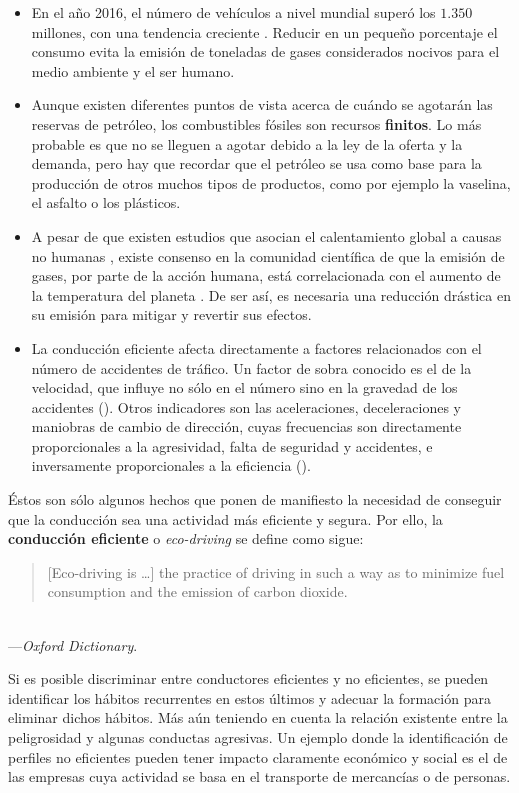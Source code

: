 \begin{itemize}
	\item En el año 2016, el número de vehículos a nivel mundial superó los $1.350$ millones, con una tendencia creciente \cite{oica2014motrate}. Reducir en un pequeño porcentaje el consumo evita la emisión de toneladas de gases considerados nocivos para el medio ambiente y el ser humano.
	\item Aunque existen diferentes puntos de vista acerca de cuándo se agotarán las reservas de petróleo, los combustibles fósiles son recursos \textbf{finitos}. Lo más probable es que no se lleguen a agotar debido a la ley de la oferta y la demanda, pero hay que recordar que el petróleo se usa como base para la producción de otros muchos tipos de productos, como por ejemplo la vaselina, el asfalto o los plásticos.
	\item A pesar de que existen estudios que asocian el calentamiento global a causas no humanas \cite{jaworowski2004solar}, existe consenso en la comunidad científica de que la emisión de gases, por parte de la acción humana, está correlacionada con el aumento de la temperatura del planeta \cite{oreskes2018scientific}. De ser así, es necesaria una reducción drástica en su emisión para mitigar y revertir sus efectos.
	\item La conducción eficiente afecta directamente a factores relacionados con el número de accidentes de tráfico. Un factor de sobra conocido es el de la velocidad, que influye no sólo en el número sino en la gravedad de los accidentes (\cite{imprialou2016re}). Otros indicadores son las aceleraciones, deceleraciones y maniobras de cambio de dirección, cuyas frecuencias son directamente proporcionales a la agresividad, falta de seguridad y accidentes, e inversamente proporcionales a la eficiencia (\cite{dingus2006100, lerner2010exploration}).
\end{itemize}

Éstos son sólo algunos hechos que ponen de manifiesto la necesidad de conseguir que la conducción sea una actividad más eficiente y segura. Por ello, la \textbf{conducción eficiente} o \textit{eco-driving} se define como sigue:

\blockquote{[Eco-driving is \ldots] the practice of driving in such a way as to minimize fuel consumption and the emission of carbon dioxide.}\\---{\textit{Oxford Dictionary}}.

Si es posible discriminar entre conductores eficientes y no eficientes, se pueden identificar los hábitos recurrentes en estos últimos y adecuar la formación para eliminar dichos hábitos. Más aún teniendo en cuenta la relación existente entre la peligrosidad y algunas conductas agresivas. Un ejemplo donde la identificación de perfiles no eficientes pueden tener impacto claramente económico y social es el de las empresas cuya actividad se basa en el transporte de mercancías o de personas.

